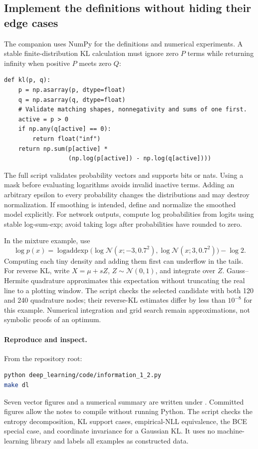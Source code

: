 \subsection{Implement the definitions without hiding their edge cases}
The companion uses NumPy for the definitions and numerical experiments.
A stable finite-distribution KL calculation must ignore zero $P$ terms while
returning infinity when positive $P$ meets zero $Q$:
\begin{lstlisting}
def kl(p, q):
    p = np.asarray(p, dtype=float)
    q = np.asarray(q, dtype=float)
    # Validate matching shapes, nonnegativity and sums of one first.
    active = p > 0
    if np.any(q[active] == 0):
        return float("inf")
    return np.sum(p[active] *
                  (np.log(p[active]) - np.log(q[active])))
\end{lstlisting}
The full script validates probability vectors and supports bits or nats.
Using a mask before evaluating logarithms avoids invalid inactive terms.
Adding an arbitrary epsilon to every probability changes the distributions and
may destroy normalization. If smoothing is intended, define and normalize the
smoothed model explicitly. For network outputs, compute log probabilities from
logits using stable log-sum-exp; avoid taking logs after probabilities have
rounded to zero.

In the mixture example, use
\[
\log p(x)=\operatorname{logaddexp}
\bigl(\log\mathcal N(x;-3,0.7^2),
      \log\mathcal N(x;3,0.7^2)\bigr)-\log2.
\]
Computing each tiny density and adding them first can underflow in the tails.
For reverse KL, write $X=\mu+sZ$, $Z\sim\mathcal N(0,1)$, and integrate over
$Z$. Gauss--Hermite quadrature approximates this expectation without truncating
the real line to a plotting window. The script checks the selected candidate
with both 120 and 240 quadrature nodes; their reverse-KL estimates differ by
less than $10^{-8}$ for this example. Numerical integration and grid search
remain approximations, not symbolic proofs of an optimum.

\paragraph{Reproduce and inspect.}
From the repository root:
\begin{lstlisting}[language=bash]
python deep_learning/code/information_1_2.py
make dl
\end{lstlisting}
Seven vector figures and a numerical summary are written under
. Committed figures allow the notes
to compile without running Python. The script checks the entropy decomposition,
KL support cases, empirical-NLL equivalence, the BCE special case, and coordinate
invariance for a Gaussian KL. It uses no machine-learning library and labels all
examples as constructed data.

